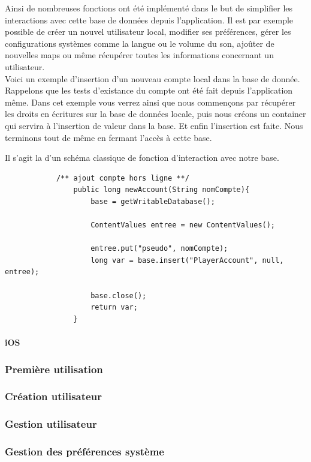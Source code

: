 \documentclass[]{report}
\begin{document}
			Ainsi de nombreuses	fonctions ont été implémenté dans le but de simplifier les interactions
			avec cette base de données depuis l'application. Il est par exemple possible de créer un nouvel 
			utilisateur local, modifier ses préférences, gérer les configurations systèmes comme la langue ou le volume
			du son, ajoûter de nouvelles maps ou même récupérer toutes les informations
			concernant un utilisateur.\\
			
			Voici un exemple d'insertion d'un nouveau compte local dans la base de
			donnée. Rappelons que les tests d'existance du compte ont été fait depuis
			l'application même. Dans cet exemple vous verrez ainsi que nous commençons
			par récupérer les droits en écritures sur la base de données locale, puis
			nous créons un container qui servira à l'insertion de valeur dans la base. Et
			enfin l'insertion est faite. Nous terminons tout de même en fermant l'accès à
			cette base.
			
			Il s'agit la d'un schéma classique de fonction d'interaction avec notre
			base.
						
			\begin{verbatim}
			/** ajout compte hors ligne **/
				public long newAccount(String nomCompte){
					base = getWritableDatabase();
			
					ContentValues entree = new ContentValues();
					
					entree.put("pseudo", nomCompte);
					long var = base.insert("PlayerAccount", null, entree);
					
					base.close();
					return var;
				}
			\end{verbatim}

			
			\paragraph{iOS}
				
			\subsubsection{Première utilisation}
			\subsubsection{Création utilisateur}
			\subsubsection{Gestion utilisateur}
			\subsubsection{Gestion des préférences système}
\end{document}
